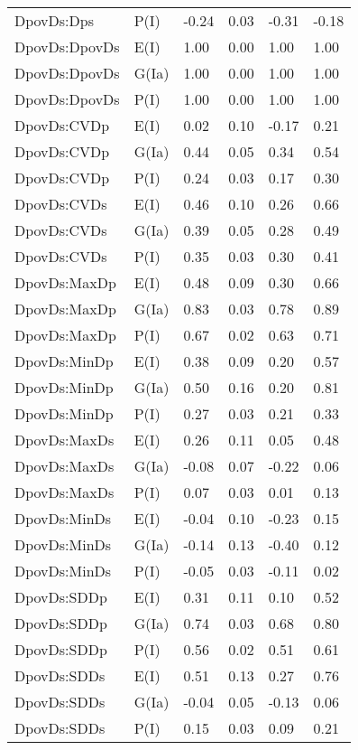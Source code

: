 \begin{center}
\begin{longtable}{|p{1.1in}|p{0.7in}|p{0.7in}|p{0.6in}|p{0.6in}|p{0.6in}|}
  DpovDs:Dps & P(I) & -0.24 & 0.03 & -0.31 & -0.18 \\ 
  DpovDs:DpovDs & E(I) & 1.00 & 0.00 & 1.00 & 1.00 \\ 
  DpovDs:DpovDs & G(Ia) & 1.00 & 0.00 & 1.00 & 1.00 \\ 
  DpovDs:DpovDs & P(I) & 1.00 & 0.00 & 1.00 & 1.00 \\ 
  DpovDs:CVDp & E(I) & 0.02 & 0.10 & -0.17 & 0.21 \\ 
  DpovDs:CVDp & G(Ia) & 0.44 & 0.05 & 0.34 & 0.54 \\ 
  DpovDs:CVDp & P(I) & 0.24 & 0.03 & 0.17 & 0.30 \\ 
  DpovDs:CVDs & E(I) & 0.46 & 0.10 & 0.26 & 0.66 \\ 
  DpovDs:CVDs & G(Ia) & 0.39 & 0.05 & 0.28 & 0.49 \\ 
  DpovDs:CVDs & P(I) & 0.35 & 0.03 & 0.30 & 0.41 \\ 
  DpovDs:MaxDp & E(I) & 0.48 & 0.09 & 0.30 & 0.66 \\ 
  DpovDs:MaxDp & G(Ia) & 0.83 & 0.03 & 0.78 & 0.89 \\ 
  DpovDs:MaxDp & P(I) & 0.67 & 0.02 & 0.63 & 0.71 \\ 
  DpovDs:MinDp & E(I) & 0.38 & 0.09 & 0.20 & 0.57 \\ 
  DpovDs:MinDp & G(Ia) & 0.50 & 0.16 & 0.20 & 0.81 \\ 
  DpovDs:MinDp & P(I) & 0.27 & 0.03 & 0.21 & 0.33 \\ 
  DpovDs:MaxDs & E(I) & 0.26 & 0.11 & 0.05 & 0.48 \\ 
  DpovDs:MaxDs & G(Ia) & -0.08 & 0.07 & -0.22 & 0.06 \\ 
  DpovDs:MaxDs & P(I) & 0.07 & 0.03 & 0.01 & 0.13 \\ 
  DpovDs:MinDs & E(I) & -0.04 & 0.10 & -0.23 & 0.15 \\ 
  DpovDs:MinDs & G(Ia) & -0.14 & 0.13 & -0.40 & 0.12 \\ 
  DpovDs:MinDs & P(I) & -0.05 & 0.03 & -0.11 & 0.02 \\ 
  DpovDs:SDDp & E(I) & 0.31 & 0.11 & 0.10 & 0.52 \\ 
  DpovDs:SDDp & G(Ia) & 0.74 & 0.03 & 0.68 & 0.80 \\ 
  DpovDs:SDDp & P(I) & 0.56 & 0.02 & 0.51 & 0.61 \\ 
  DpovDs:SDDs & E(I) & 0.51 & 0.13 & 0.27 & 0.76 \\ 
  DpovDs:SDDs & G(Ia) & -0.04 & 0.05 & -0.13 & 0.06 \\ 
  DpovDs:SDDs & P(I) & 0.15 & 0.03 & 0.09 & 0.21 \\ 

\end{longtable}
\end{center}
